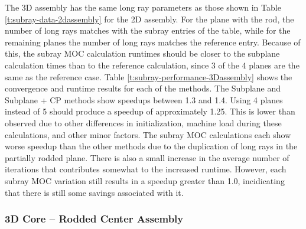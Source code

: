 The 3D assembly has the same long ray parameters as those shown in Table \ref{t:subray-data-2dassembly} for the 2D assembly.  For the plane with the rod, the number of long rays matches with the subray entries of the table, while for the remaining planes the number of long rays matches the reference entry.  Because of this, the subray MOC calculation runtimes should be closer to the subplane calculation times than to the reference calculation, since 3 of the 4 planes are the same as the reference case.  Table \ref{t:subray-performance-3Dassembly} shows the convergence and runtime results for each of the methods.  The Subplane and Subplane + CP methods show speedups between 1.3 and 1.4.  Using 4 planes instead of 5 should produce a speedup of approximately 1.25.  This is lower than observed due to other differences in initialization, machine load during these calculations, and other minor factors.  The subray MOC calculations each show worse speedup than the other methods due to the duplication of long rays in the partially rodded plane.  There is also a small increase in the average number of iterations that contributes somewhat to the increased runtime.  However, each subray MOC variation still results in a speedup greater than 1.0, incidicating that there is still some savings associated with it.

\subsubsection{3D Core -- Rodded Center Assembly}

